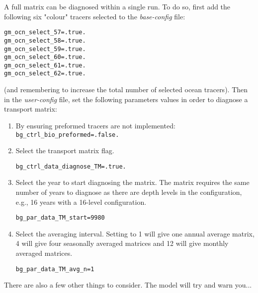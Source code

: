 \documentclass[11pt,fleqn]{book} %
\begin{document}
A full matrix can be diagnosed within a single run. To do so, first add the following six "colour" tracers selected to the \textit{base-config} file:
\begin{verbatim}
gm_ocn_select_57=.true.
gm_ocn_select_58=.true.
gm_ocn_select_59=.true.
gm_ocn_select_60=.true.
gm_ocn_select_61=.true.
gm_ocn_select_62=.true.
\end{verbatim}

\noindent (and remembering to increase the total number of selected ocean tracers). Then in the \textit{user-config} file, set the following parameters values in order to diagnose a transport matrix:

\vspace{2mm}
\begin{enumerate}
\vspace{1mm}
\item By ensuring preformed tracers are not implemented:
\\\texttt{bg\_ctrl\_bio\_preformed=.false.}
\vspace{1mm}
\item Select the transport matrix flag.
\begin{verbatim}
bg_ctrl_data_diagnose_TM=.true.
\end{verbatim}
\item Select the year to start diagnosing the matrix. The matrix requires the same number of years to diagnose as there are depth levels in the configuration, e.g., 16 years with a 16-level configuration.
\begin{verbatim}
bg_par_data_TM_start=9980
\end{verbatim}
\item Select the averaging interval. Setting to 1 will give one annual average matrix, 4 will give four seasonally averaged matrices and 12 will give monthly averaged matrices.
\begin{verbatim}
bg_par_data_TM_avg_n=1
\end{verbatim}
\end{enumerate}
\vspace{2mm}

\noindent There are also a few other things to consider. The model will try and warn you...
\end{document}
